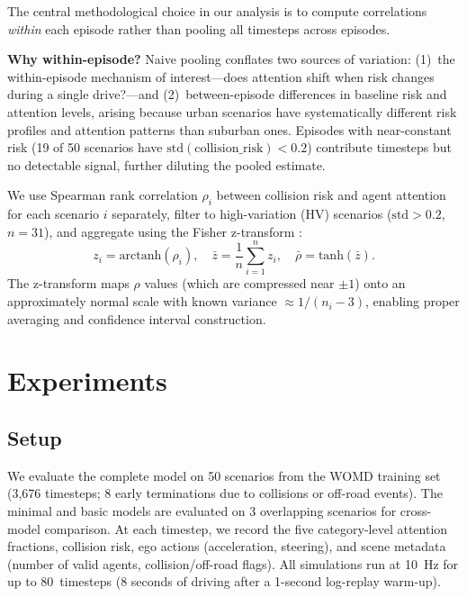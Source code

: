 \documentclass[10pt]{article} %
\begin{document}
The central methodological choice in our analysis is to compute correlations \textit{within} each episode rather than pooling all timesteps across episodes.

\textbf{Why within-episode?} Naive pooling conflates two sources of variation: (1)~the within-episode mechanism of interest---does attention shift when risk changes during a single drive?---and (2)~between-episode differences in baseline risk and attention levels, arising because urban scenarios have systematically different risk profiles and attention patterns than suburban ones. Episodes with near-constant risk (19 of 50 scenarios have $\mathrm{std}(\mathrm{collision\_risk}) < 0.2$) contribute timesteps but no detectable signal, further diluting the pooled estimate.

We use Spearman rank correlation $\rho_i$ between collision risk and agent attention for each scenario $i$ separately, filter to high-variation (HV) scenarios ($\mathrm{std} > 0.2$, $n{=}31$), and aggregate using the Fisher z-transform \citep{fisher1921probable}:
\begin{equation}
    z_i = \mathrm{arctanh}(\rho_i), \quad \bar{z} = \frac{1}{n}\sum_{i=1}^{n} z_i, \quad \bar{\rho} = \mathrm{tanh}(\bar{z}).
\end{equation}
The z-transform maps $\rho$ values (which are compressed near $\pm1$) onto an approximately normal scale with known variance $\approx 1/(n_i - 3)$, enabling proper averaging and confidence interval construction.

\section{Experiments}
\label{sec:experiments}

\subsection{Setup}

We evaluate the complete model on 50 scenarios from the WOMD training set (3,676 timesteps; 8 early terminations due to collisions or off-road events). The minimal and basic models are evaluated on 3 overlapping scenarios for cross-model comparison. At each timestep, we record the five category-level attention fractions, collision risk, ego actions (acceleration, steering), and scene metadata (number of valid agents, collision/off-road flags). All simulations run at 10~Hz for up to 80~timesteps (8 seconds of driving after a 1-second log-replay warm-up).
\end{document}
